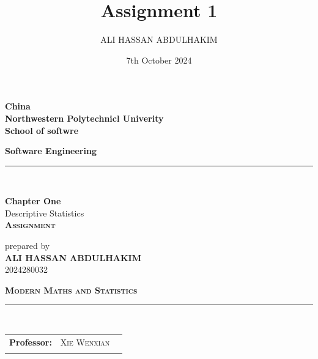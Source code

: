 \documentclass{article}
\title{Assignment 1}
\author{ALI HASSAN ABDULHAKIM }
\date{7th October 2024}
\begin{document}
\begin{titlepage}
    \newcommand{\HRule}{\rule{\linewidth}{0.35mm}} %
    \begin{flushleft}
        {\scriptsize
        \textbf{\large{China}}\\
        \textbf{\large{Northwestern Polytechnicl Univerity}}\\
        \textbf{\large{School of softwre }}\\

        \textbf{\large{Software Engineering}}}
    \end{flushleft}
    \HRule \\[0.3cm]
    \begin{center}
        \textbf{\textbf{\huge{Chapter One}}}\\
        Descriptive Statistics\\
        \textbf{\textsc{\large{Assignment }}}\\
    \end{center}
    \begin{center}
        prepared by\\
        \textbf{{\large ALI HASSAN ABDULHAKIM}}\\
        \textsc{{\large 2024280032}}\\
    \end{center}
    \begin{center}
        \textbf{\textsc{\huge{ Modern Maths and  Statistics}}}\\

        \HRule \\
    \end{center}

    \begin{center}
        \begin{tabular}{lll}
            \textbf{Professor:}  & \textsc{Xie Wenxian} 
            \tabularnewline
            \tabularnewline
        \end{tabular}
    \end{center}
    \sloppy
\end{titlepage}
\end{document}
